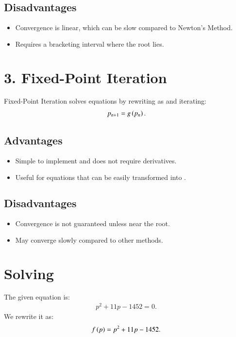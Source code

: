 \documentclass[journal]{IEEEtran}
\begin{document}
\subsection*{Disadvantages}
\begin{itemize}
    \item Convergence is linear, which can be slow compared to Newton's Method.
    \item Requires a bracketing interval  where the root lies.
\end{itemize}

\section*{3. Fixed-Point Iteration}
Fixed-Point Iteration solves equations by rewriting  as  and iterating:
\begin{align}
    p_{n+1} = g\left(p_n\right).
\end{align}

\subsection*{Advantages}
\begin{itemize}
    \item Simple to implement and does not require derivatives.
    \item Useful for equations that can be easily transformed into .
\end{itemize}

\subsection*{Disadvantages}
\begin{itemize}
    \item Convergence is not guaranteed unless  near the root.
    \item May converge slowly compared to other methods.
\end{itemize}

\section*{ Solving }
The given equation is:
\begin{align}
    p^2 + 11p - 1452 = 0.
\end{align}
We rewrite it as:
\begin{align}
    f\left(p\right) = p^2 + 11p - 1452.
\end{align}
\end{document}
